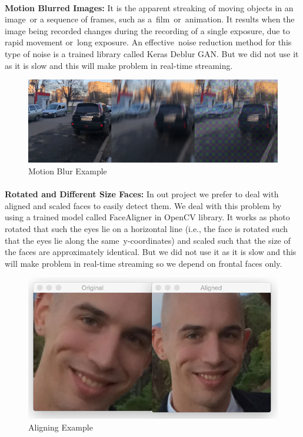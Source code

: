 \paragraph{}
\textbf{Motion Blurred Images:}\newline
It is the apparent streaking of moving objects in an image or a sequence of frames, such as a film or animation. It results when the image being recorded changes during the recording of a single exposure, due to rapid movement or long exposure.\newline
An effective noise reduction method for this type of noise is a trained library called Keras Deblur GAN.\newline
But we did not use it as it is slow and this will make problem in real-time streaming.
\begin{figure}[H]
	\centering
	\includegraphics[width=\linewidth]{images/motion_blur.png}
	\caption{Motion Blur Example}
\end{figure}
\paragraph{}
\textbf{Rotated and Different Size Faces:}\newline
In out project we prefer to deal with aligned and scaled faces to easily detect them.\newline
We deal with this problem by using a trained model called FaceAligner in OpenCV library.\newline
It works as photo rotated that such the eyes lie on a horizontal line (i.e., the face is rotated such that the eyes lie along the same y-coordinates) and scaled such that the size of the faces are approximately identical.\newline
But we did not use it as it is slow and this will make problem in real-time streaming so we depend on frontal faces only.
\begin{figure}[H]
	\centering
	\includegraphics[width=\linewidth]{images/Aligning.jpg}
	\caption{Aligning Example}
\end{figure}
\newpage
